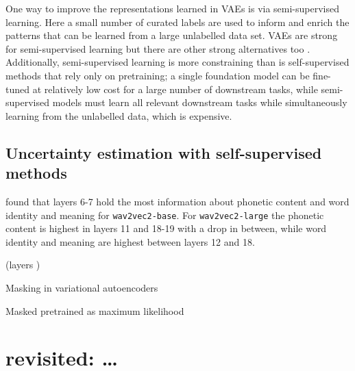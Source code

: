 One way to improve the representations learned in VAEs is via semi-supervised learning. 
Here a small number of curated labels are used to inform and enrich the patterns that can be learned from a large unlabelled data set. 
VAEs are strong for semi-supervised learning but there are other strong alternatives too \cite{jiang_speech_2021}. Additionally, semi-supervised learning is more constraining than is self-supervised methods that rely only on pretraining; a single foundation model can be fine-tuned at relatively low cost for a large number of downstream tasks, while semi-supervised models must learn all relevant downstream tasks while simultaneously learning from the unlabelled data, which is expensive. 



\subsection{Uncertainty estimation with self-supervised methods}
%


\textcite{pasad_layerwise_2021} found that layers 6-7 hold the most information about phonetic content and word identity and meaning for \texttt{wav2vec2-base}. 
For \texttt{wav2vec2-large} the phonetic content is highest in layers 11 and 18-19 with a drop in between, while word identity and meaning are highest between layers 12 and 18. 

(layers )



Masking in variational autoencoders

Masked pretrained as maximum likelihood





\section{ revisited: \dots}



